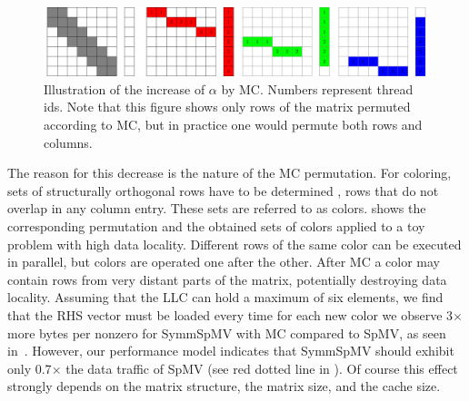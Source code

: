   \begin{figure}[t]
  	\centering
  	\includegraphics[scale=0.45]{pics/mc_alpha_problem/mc_alpha_unsymm}
  	\caption{Illustration of the increase of $\alpha$ by \acrshort{MC}. Numbers represent thread ids. Note that this figure shows only rows of the matrix permuted according to \acrshort{MC}, but in practice one would permute both rows and columns.}
  	\label{fig:mc_alpha}
  \end{figure}
  
The reason for this decrease is the nature of the \acrshort{MC}
permutation. For \DTWO coloring, sets of structurally orthogonal
rows have to be determined \cite{dist_k_def}, \ie rows that do not
overlap in any column entry. These sets are referred to as colors.  shows the corresponding permutation
and the obtained sets of colors  applied to a toy problem with high
data locality. Different rows of the same color can be executed in
parallel, but colors are operated one after the
other. After \acrshort{MC} a color may contain rows from very distant
parts of the matrix, potentially destroying data locality.  Assuming
that the \acrshort{LLC} can hold a maximum of six elements, we find
that the RHS vector must be loaded every time for each
new color 
  we observe 3$\times$ more bytes
per nonzero for \acrshort{SymmSpMV} with \acrshort{MC} compared
to \acrshort{SpMV}, as seen in~.  However,
our performance model indicates that \acrshort{SymmSpMV} should
exhibit only 0.7$\times$ the data traffic of \acrshort{SpMV} (see
red dotted line in ). Of course this
effect strongly depends on the matrix structure, the matrix size, and
the cache size.
        
